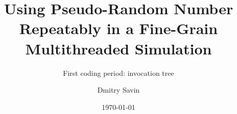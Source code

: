 \documentclass[aspectratio=169, 14pt]{beamer}
\title{Using Pseudo-Random Number Repeatably in a Fine-Grain Multithreaded Simulation}
\subtitle{First coding period: invocation tree}
\author{Dmitry Savin}
\date{\today}
\begin{document}
\begin{large}

 \frame{\titlepage}



 \end{large}
\end{document}
